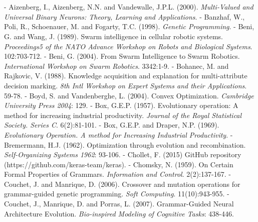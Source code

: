 \documentclass[spanish,a4paper,12pt,twoside]{report}
\begin{document}
  \chapter{\vspace{-3cm}{\LARGE 8. Conclusiones y líneas futuras}}
  \vfill
  
  \begin{thebibliography}{00}
  \vspace{-1cm}
  \makeatletter
  \def\@biblabel#1{}
  \let\old@bibitem\bibitem
  \def\bibitem#1{\old@bibitem{#1}\leavevmode\kern-\bibindent}
  \makeatother
  
   Aizenberg, I., Aizenberg, N.N. and Vandewalle, J.P.L. (2000). \emph{Multi-Valued and Universal Binary Neurons: Theory, Learning and Applications}.
   Banzhaf, W., Poli, R., Schoenauer, M. and Fogarty, T.C. (1998). \emph{Genetic Programming}.
   Beni, G. and Wang, J. (1989). Swarm intelligence in cellular robotic systems. \emph{Proceedings5 of the NATO Advance Workshop on Robots and Biological Systems}. 102:703-712.
   Beni, G. (2004). From Swarm Intelligence to Swarm Robotics. \emph{International Workshop on Swarm Robotics}. 3342:1-9.
   Bohanec, M. and Rajkovic, V. (1988). Knowledge acquisition and explanation for multi-attribute decision marking. \emph{8th Intl Workshop on Expert Systems and their Applications}. 59-78.
   Boyd, S. and Vandenberghe, L. (2004). Convex Optimization. \emph{Cambridge University Press 2004}: 129.
   Box, G.E.P. (1957). Evolutionary operation: A method for increasing industrial productivity. \emph{Journal of the Royal Statistical Society. Series C}. 6(2):81-101.
   Box, G.E.P. and Draper, N.P. (1969). \emph{Evolutionary Operation. A method for Increasing Industrial Productivity}.
   Bremermann, H.J. (1962). Optimization through evolution and recombination. \emph{Self-Organizing Systems 1962}: 93-106.
   Chollet, F. (2015) GitHub repository (https://github.com/keras-team/keras).
   Chomsky, N. (1959). On Certain Formal Properties of Grammars. \emph{Information and Control}. 2(2):137-167.
   Couchet, J. and Manrique, D. (2006). Crossover and mutation operations for grammar-guided genetic programming. \emph{Soft Computing}. 11(10):943-955.
   Couchet, J., Manrique, D. and Porras, L. (2007). Grammar-Guided Neural Architecture Evolution. \emph{Bio-inspired Modeling of Cognitive Tasks}: 438-446.

\end{thebibliography}
\end{document}

